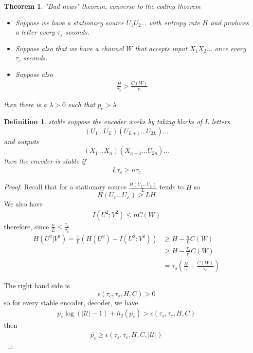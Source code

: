 \documentclass{article}
\newtheorem{theorem}{Theorem}[section]
\newtheorem{definition}{Definition}[section]
\theoremstyle{definition} %
\def\U{\mathcal{U}}
\begin{document}
\begin{theorem}{"Bad news" theorem, converse to the coding theorem}
  \begin{itemize}
    \item Suppose we have a stationary source $U_1 U_2 ...$ with entropy rate $H$ and produces a letter every $\tau_s$ seconds.
    \item Suppose also that we have a channel $W$ that accepts input $X_1 X_2 ...$ once every $\tau_c$ seconds.
    \item Suppose also 
    \begin{align*}
      \frac{H}{\tau_s} > \frac{C(W)}{\tau_c}
    \end{align*}
  \end{itemize}
  then there is a $\lambda > 0$ such that $\bar{p_e} > \lambda$
\end{theorem}

\begin{definition}{stable}
  suppose the encoder works by taking blocks of $L$ letters 
  $$(U_1 ... U_L)(U_{L+1} ... U_{2L})...$$
  and outputs
  $$(X_1 ... X_n)(X_{n+1} ... U_{2n})...$$
  then the encoder is stable if
  \begin{align*}
    L \tau_s \geq n \tau_c
  \end{align*}
\end{definition}

\begin{proof}
  Recall that for a stationary source $\frac{H(U_1 ... U_L)}{L}$ tends to $H$ so 
  $$ H(U_1 ... U_L) \geq L H$$
  We also have
  \begin{align*}
    I(U^2; V^2) \leq n C(W)
  \end{align*}
  therefore, since $\frac{n}{L} \leq \frac{\tau_s}{\tau_c}$
  \begin{align*}
    H(U^2 | V^2) = \frac{1}{L} (H(U^2) - I(U^2; V^2)) &\geq H - \frac{n}{L} C(W) \\
    &\geq H - \frac{\tau_s}{\tau_c} C(W) \\
    &= \tau_s (\frac{H}{\tau_s} - \frac{C(W)}{\tau_c}) 
  \end{align*}

  The right hand side is 
  $$\epsilon(\tau_c, \tau_s, H, C) > 0$$
  so for every stable encoder, decoder, we have
  \begin{align*}
    \bar{p_e} \log(|\U| - 1) + h_2(\bar{p_e}) > \epsilon(\tau_s, \tau_c, H, C)
  \end{align*}
  then 
  \begin{align*}
    \bar{p_e} \geq \epsilon(\tau_s, \tau_c, H, C, |\U|)
  \end{align*}
\end{proof}
\end{document}

